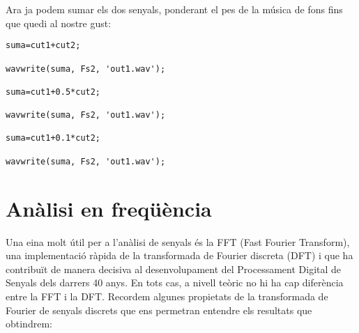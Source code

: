 \documentclass{article}
\begin{document}
Ara ja podem sumar els dos senyals, ponderant el pes de la música de fons fins que quedi al nostre gust:

\begin{verbatim}
suma=cut1+cut2;

wavwrite(suma, Fs2, 'out1.wav');

suma=cut1+0.5*cut2;

wavwrite(suma, Fs2, 'out1.wav');

suma=cut1+0.1*cut2;

wavwrite(suma, Fs2, 'out1.wav');
\end{verbatim}

\section{Anàlisi en freqüència}

Una eina molt útil per a l'anàlisi de senyals és la FFT (Fast Fourier Transform), una implementació
ràpida de la transformada de Fourier discreta (DFT) i que ha contribuït de manera decisiva al desenvolupament
del Processament Digital de Senyals dels darrers 40 anys. En tots cas, a nivell teòric no hi ha cap
diferència entre la FFT i la DFT. Recordem algunes propietats de la transformada de Fourier de senyals discrets
que ens permetran entendre els resultats que obtindrem:
\end{document}
